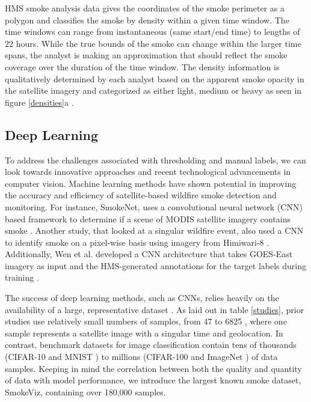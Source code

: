HMS smoke analysis data gives the coordinates of the smoke perimeter as a polygon and classifies the smoke by density within a given time window. The time windows can range from instantaneous (same start/end time) to lengths of 22 hours. While the true bounds of the smoke can change within the larger time spans, the analyst is making an approximation that should reflect the smoke coverage over the duration of the time window. The density information is qualitatively determined by each analyst based on the apparent smoke opacity in the satellite imagery and categorized as either light, medium or heavy as seen in figure \ref{densities}a \cite{hms_web}.

\subsection{Deep Learning}

To address the challenges associated with thresholding and manual labels, we can look towards innovative approaches and recent technological advancements in computer vision. Machine learning methods have shown potential in improving the accuracy and efficiency of satellite-based wildfire smoke detection and monitoring. For instance, SmokeNet, uses a convolutional neural network (CNN) based framework to determine if a scene of MODIS satellite imagery contains smoke \cite{smokenet}. Another study, that looked at a singular wildfire event, also used a CNN to identify smoke on a pixel-wise basis using imagery from Himiwari-8 \cite{larsen}. Additionally, Wen et al. developed a CNN architecture that takes GOES-East imagery as input and the HMS-generated annotations for the target labels during training \cite{smoke_goes}. 

The success of deep learning methods, such as CNNs, relies heavily on the availability of a large, representative dataset \cite{data_size}. As laid out in table \ref{studies}, prior studies use relatively small numbers of samples, from 47 \cite{wang} to 6825 \cite{smoke_goes}, where one sample represents a satellite image with a singular time and geolocation. In contrast, benchmark datasets for image classification contain tens of thousands (CIFAR-10 \cite{cifar} and MNIST \cite{mnist}) to millions (CIFAR-100 and ImageNet \cite{imgnet}) of data samples. Keeping in mind the correlation between both the quality and quantity of data with model performance, we introduce the largest known smoke dataset, SmokeViz, containing over 180,000 samples.

